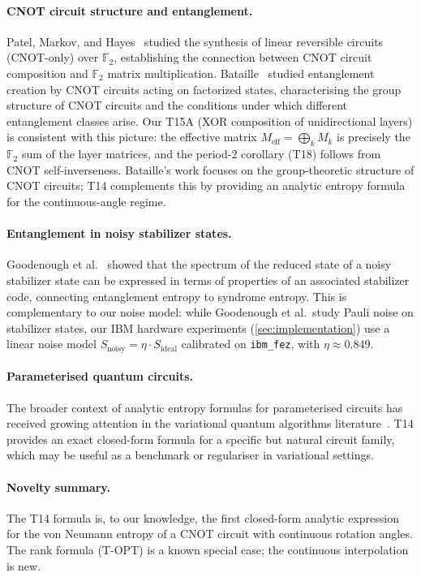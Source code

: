 \documentclass[11pt,a4paper]{article}
\newcommand{\F}{\mathbb{F}}
\newcommand{\VNE}{S}
\begin{document}
\paragraph{CNOT circuit structure and entanglement.}
Patel, Markov, and Hayes~\cite{patel2008optimal} studied the synthesis of
linear reversible circuits (CNOT-only) over $\F_2$, establishing the
connection between CNOT circuit composition and $\F_2$ matrix multiplication.
Bataille~\cite{bataille2022cnot} studied entanglement creation by CNOT
circuits acting on factorized states, characterising the group structure of
CNOT circuits and the conditions under which different entanglement classes
arise.  Our T15A (XOR composition of unidirectional layers) is consistent with
this picture: the effective matrix $M_{\mathrm{eff}} = \bigoplus_k M_k$ is
precisely the $\F_2$ sum of the layer matrices, and the period-2 corollary
(T18) follows from CNOT self-inverseness.  Bataille's work focuses on the
group-theoretic structure of CNOT circuits; T14 complements this by providing
an analytic entropy formula for the continuous-angle regime.

\paragraph{Entanglement in noisy stabilizer states.}
Goodenough et al.~\cite{goodenough2024noisy} showed that the spectrum of the
reduced state of a noisy stabilizer state can be expressed in terms of
properties of an associated stabilizer code, connecting entanglement entropy
to syndrome entropy.  This is complementary to our noise model: while
Goodenough et al.\ study Pauli noise on stabilizer states, our IBM hardware
experiments (\cref{sec:implementation}) use a linear noise model
$\VNE_{\mathrm{noisy}} = \eta \cdot \VNE_{\mathrm{ideal}}$ calibrated on
\texttt{ibm\_fez}, with $\eta \approx 0.849$.

\paragraph{Parameterised quantum circuits.}
The broader context of analytic entropy formulas for parameterised circuits
has received growing attention in the variational quantum algorithms
literature~\cite{cerezo2021variational}.  T14 provides an exact closed-form
formula for a specific but natural circuit family, which may be useful as a
benchmark or regulariser in variational settings.

\paragraph{Novelty summary.}
The T14 formula is, to our knowledge, the first closed-form analytic expression
for the von Neumann entropy of a CNOT circuit with continuous rotation angles.
The rank formula (T-OPT) is a known special case; the continuous interpolation
is new.
\end{document}
